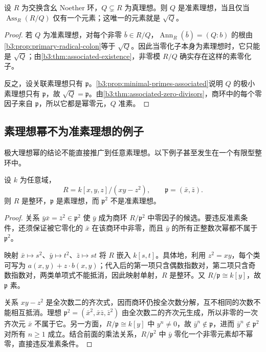 \begin{proposition}\label{b3:prop:primary-associated-singleton}
	设 \(R\) 为交换含幺 Noether 环，\(Q\subsetneq R\) 为真理想。则 \(Q\) 是准素理想，当且仅当 \(\operatorname{Ass}_R(R/Q)\) 仅有一个元素；这唯一的元素就是 \(\sqrt Q\)。
\end{proposition}
\begin{proof}
	若 \(Q\) 为准素理想，对每个非零 \(\bar b\in R/Q\)，\(\operatorname{Ann}_R(\bar b)=(Q:b)\) 的根由\cref{b3:prop:primary-radical-colon}等于 \(\sqrt Q\)。因此当零化子本身为素理想时，它只能是 \(\sqrt Q\)；由\cref{b3:thm:associated-existence}，非零模 \(R/Q\) 确实存在这样的素零化子。

	反之，设关联素理想只有 \(\mathfrak p\)。\cref{b3:prop:minimal-primes-associated}说明 \(Q\) 的极小素理想只有 \(\mathfrak p\)，故 \(\sqrt Q=\mathfrak p\)。由\cref{b3:thm:associated-zero-divisors}，商环中的每个零因子来自 \(\mathfrak p\)，所以它都是幂零元，\(Q\) 准素。
\end{proof}

\subsection{素理想幂不为准素理想的例子}
\label{b3:subsec:0402:02}

极大理想幂的结论不能直接推广到任意素理想。以下例子甚至发生在一个有限型整环中。

\begin{example}\label{b3:exm:prime-square-not-primary}
	设 \(k\) 为任意域，
	\[
		R=k[x,y,z]/(xy-z^2),\qquad \mathfrak p=(\bar x,\bar z).
	\]
	则 \(R\) 是整环，\(\mathfrak p\) 是素理想，而 \(\mathfrak p^2\) 不是准素理想。
\end{example}
\begin{proof}
	关系 \(\bar y\bar x=\bar z^2\in\mathfrak p^2\) 使 \(\bar y\) 成为商环 \(R/\mathfrak p^2\) 中零因子的候选。要违反准素条件，还须保证被它零化的 \(\bar x\) 在该商环中非零，而且 \(\bar y\) 的所有正整数次幂都不属于 \(\mathfrak p^2\)。

	映射 \(\bar x\mapsto s^2\)、\(\bar y\mapsto t^2\)、\(\bar z\mapsto st\) 将 \(R\) 嵌入 \(k[s,t]\)。具体地，利用 \(z^2=xy\)，每个类可写为 \(a(x,y)+z\cdot b(x,y)\)；代入后的第一项只含偶数指数对，第二项只含奇数指数对，两类单项式不能抵消，因此映射单射，\(R\) 是整环。又 \(R/\mathfrak p\cong k[y]\)，故 \(\mathfrak p\) 素。

	关系 \(xy-z^2\) 是全次数二的齐次式，因而商环仍按全次数分解，互不相同的次数不能相互抵消。理想 \(\mathfrak p^2=(\bar x^2,\bar x\bar z,\bar z^2)\) 由全次数二的齐次元生成，所以非零的一次齐次元 \(\bar x\) 不属于它。另一方面，\(R/\mathfrak p\cong k[y]\) 中 \(y^n\ne0\)，故 \(\bar y^n\notin\mathfrak p\)，进而 \(\bar y^n\notin\mathfrak p^2\) 对所有 \(n\ge1\) 成立。结合前面的乘法关系，\(R/\mathfrak p^2\) 中 \(\bar y\) 零化一个非零元素却不幂零，直接违反准素条件。
\end{proof}

